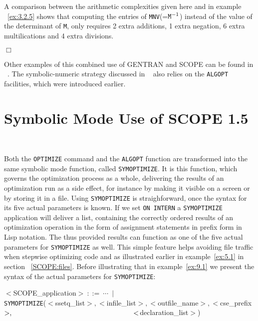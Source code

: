 A comparison between the arithmetic complexities given here and in example
~\ref{ex:3.2.5} shows that computing the entries of {\tt MNV}(=${\tt M}^{-1}$)
instead of the value of the determinant of {\tt M}, only requires 2
extra additions, 1 extra negation, 6 extra multilications and 4 extra
divisions.
{\small
\begin{flushright}
$\Box$
\end{flushright}}

Other examples of this combined use of GENTRAN and SCOPE can be found
in ~\cite{vanHulzen:95,Ganzha:94}. The symbolic-numeric strategy discussed in
~\cite{Ganzha:94} also relies on the {\tt ALGOPT} facilities, which were
introduced earlier.
\newpage
\section{Symbolic Mode Use of SCOPE 1.5}~\label{SCOPE:symb}

Both the {\tt OPTIMIZE} command and the {\tt ALGOPT} function are transformed
into the same symbolic mode function, called {\tt SYMOPTIMIZE}. It is this
function, which governs the optimization process as a whole, delivering
the results of an optimization run as a side effect, for instance by making
it visible on a screen or by storing it in a file. Using {\tt SYMOPTIMIZE}
is straighforward, once the syntax for its five actual parameters is known.
If we set {\tt ON INTERN} a {\tt SYMOPTIMIZE} application will deliver a
list, containing the correctly ordered results of an optimization operation
in the form of assignment statements in prefix form in Lisp notation. The thus
provided results can function as one of the five actual parameters for
{\tt SYMOPTIMIZE} as well. This simple feature helps avoiding file traffic
when stepwise optimizing code and as illustrated earlier in example~\ref{ex:5.1}
in section ~\ref{SCOPE:files}. Before illustrating that in example~\ref{ex:9.1}
we present the syntax of the actual parameters for {\tt SYMOPTIMIZE}:

$<$SCOPE\_application$>~::=~\cdots~\mid$\\
\hspace*{1cm} {\tt SYMOPTIMIZE}($<$ssetq\_list$>,<$infile\_list$>,<$outfile\_name$>,<$cse\_prefix$>,\\
\hspace*{6cm} <$declaration\_list$>$)

